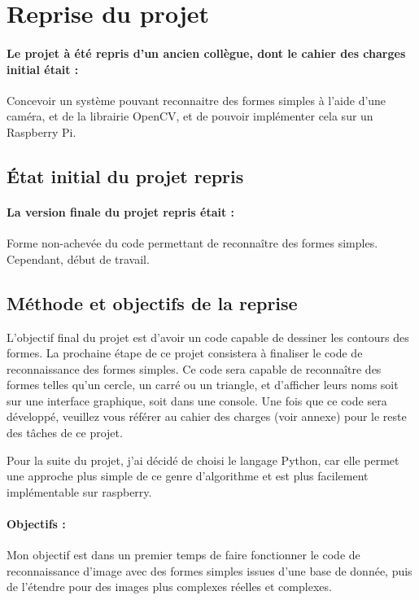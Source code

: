 \section{Reprise du projet}
\paragraph{Le projet à été repris d'un ancien collègue, dont le cahier des charges initial était :}

Concevoir un système pouvant reconnaitre des formes simples à l’aide d’une caméra, et de la librairie OpenCV, et de pouvoir implémenter cela sur un Raspberry Pi.

\subsection{État initial du projet repris}
\paragraph{La version finale du projet repris était :} Forme non-achevée du code permettant de reconnaître des formes simples. Cependant, début de travail.

\subsection{Méthode et objectifs de la reprise}
L'objectif final du projet est d'avoir un code capable de dessiner les contours des formes.
La prochaine étape de ce projet consistera à finaliser le code de reconnaissance des formes simples. Ce code sera capable de reconnaître des formes telles qu'un cercle, un carré ou un triangle, et d'afficher leurs noms soit sur une interface graphique, soit dans une console.
Une fois que ce code sera développé, veuillez vous référer au cahier des charges (voir annexe) pour le reste des tâches de ce projet.

Pour la suite du projet, j'ai décidé de choisi le langage Python, car elle permet une approche plus simple de ce genre d'algorithme et est plus facilement implémentable sur raspberry.

\paragraph{Objectifs :}
Mon objectif est dans un premier temps de faire fonctionner le code de reconnaissance d'image avec des formes simples issues d'une base de donnée, puis de l'étendre pour des images plus complexes réelles et complexes.


